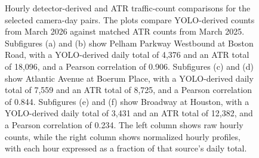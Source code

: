 \begin{figure}[!htbp]
    \caption[Hourly YOLO and ATR traffic-count comparisons.]
            {Hourly detector-derived and ATR traffic-count comparisons for the 
             selected camera-day pairs. The plots compare YOLO-derived counts from 
             March 2026 against matched ATR counts from March 2025. Subfigures 
             (a) and (b) show Pelham Parkway Westbound at Boston Road, with a 
             YOLO-derived daily total of 4,376 and an ATR total of 18,096, and a
             Pearson correlation of 0.906. Subfigures (c) and (d) show Atlantic 
             Avenue at Boerum Place, with a YOLO-derived daily total of 7,559 and
             an ATR total of 8,725, and a Pearson correlation of 0.844. Subfigures
             (e) and (f) show Broadway at Houston, with a YOLO-derived daily total
             of 3,431 and an ATR total of 12,382, and a Pearson correlation of 0.234.
             The left column shows raw hourly counts, while the right column shows 
             normalized hourly profiles, with each hour expressed as a fraction of 
             that source's daily total.}
    \label{fig:atr-hourly-comparisons}
\end{figure}
\FloatBarrier

